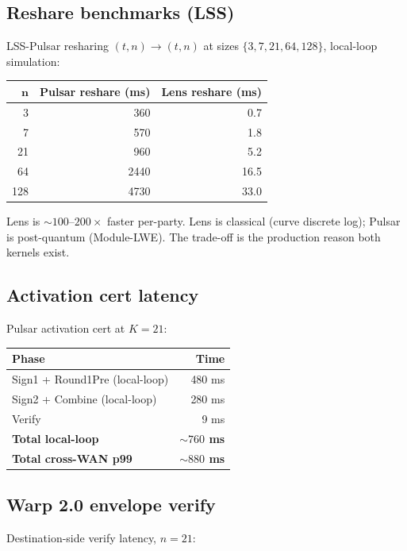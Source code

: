 \documentclass[11pt,a4paper]{article}
\begin{document}
\subsection{Reshare benchmarks (LSS)}

LSS-Pulsar resharing $(t, n) \to (t, n)$ at sizes $\{3, 7, 21, 64, 128\}$, local-loop simulation:

\begin{tabular}{@{}rrr@{}}
  \toprule
  $\mathbf{n}$ & \textbf{Pulsar reshare (ms)} & \textbf{Lens reshare (ms)} \\
  \midrule
  3   & 360  & 0.7 \\
  7   & 570  & 1.8 \\
  21  & 960  & 5.2 \\
  64  & 2440 & 16.5 \\
  128 & 4730 & 33.0 \\
  \bottomrule
\end{tabular}

Lens is $\sim 100$--$200\times$ faster per-party. Lens is classical (curve discrete log); Pulsar is post-quantum (Module-LWE). The trade-off is the production reason both kernels exist.

\subsection{Activation cert latency}

Pulsar activation cert at $K = 21$:

\begin{tabular}{@{}lr@{}}
  \toprule
  \textbf{Phase} & \textbf{Time} \\
  \midrule
  Sign1 + Round1Pre (local-loop)  & 480 ms \\
  Sign2 + Combine (local-loop)    & 280 ms \\
  Verify                          & 9 ms \\
  \midrule
  \textbf{Total local-loop}       & \textbf{$\sim 760$ ms} \\
  \textbf{Total cross-WAN p99}    & \textbf{$\sim 880$ ms} \\
  \bottomrule
\end{tabular}

\subsection{Warp 2.0 envelope verify}

Destination-side verify latency, $n = 21$:
\end{document}
